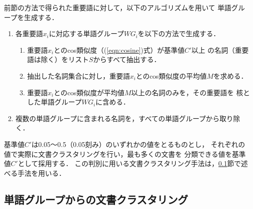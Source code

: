 \documentclass[japanese]{jnlp_1.4}
\begin{document}
前節の方法で得られた重要語に対して，以下のアルゴリズムを用いて
単語グループを生成する．
\begin{enumerate}
\item 各重要語$x_i$に対応する単語グループ$WG_i$を以下の方法で生成する．
  \begin{enumerate}
  \item 重要語$x_i$とのcos類似度（(\ref{eqn:cosine})式）が基準値$C'$以上
    の名詞（重要語は除く）をリスト$S$からすべて抽出する．
  \item 抽出した名詞集合に対し，重要語$x_i$とのcos類似度の平均値$M$を求める．
  \item 重要語$x_i$とのcos類似度が平均値$M$以上の名詞のみを，その重要語を
    核とした単語グループ$WG_i$に含める．
  \end{enumerate}
\item 複数の単語グループに含まれる名詞を，すべての単語グループから取り除く．
\end{enumerate}
基準値$C'$は0.05〜0.5（0.05刻み）のいずれかの値をとるものとし，
それぞれの値で実際に文書クラスタリングを行い，最も多くの文書を
分類できる値を基準値$C'$として採用する．
この判別に用いる文書クラスタリング手法は，\ref{sec_bun}節で述べる手法を用いる．


\subsection{単語グループからの文書クラスタリング} \label{sec_bun}
\end{document}
